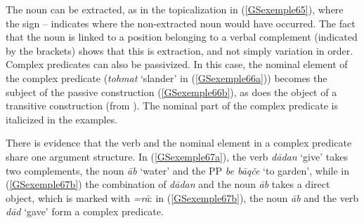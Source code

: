 \z
The noun can be extracted, as in the topicalization in (\ref{GSexemple65}), where the sign -- indicates where the non-extracted noun would have occurred. 
\z
The fact that the noun is linked to a position belonging to a verbal complement (indicated by the brackets) shows that this is extraction, and not simply variation in order.
Complex predicates can also be passivized. In this case, the nominal element of the complex predicate (\emph{tohmat} `slander' in (\ref{GSexemple66a})) becomes the subject of the passive construction (\ref{GSexemple66b}), as does the object of a transitive construction (from \citealt[251]{pollet2012grammaire}). The nominal part of the complex predicate is italicized in the examples.





\eal
	\label{GSexemple66} 
	\label{GSexemple66a}
		
    \label{GSexemple66b}
\zl

\noindent
There is evidence that the verb and the nominal element in a complex predicate share one argument structure. In (\ref{GSexemple67a}), the verb \emph{d\=adan} `give' takes two complements, the noun \emph{\=ab} `water' and the PP \emph{be b\=aq\v ce} `to garden', while in (\ref{GSexemple67b}) the combination of \emph{d\=adan} and the noun \emph{\=ab} takes a direct object, which is marked with \emph{=r\=a}: in (\ref{GSexemple67b}), the noun \emph{\=ab} and the verb \emph{d\=ad} `gave' form a complex predicate.  

